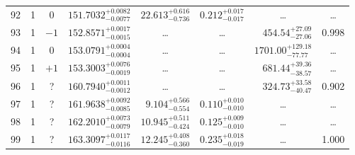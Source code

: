 \begin{table*}[!]
\begin{tabular}{llcrrlrc}
92 & 1 & 0 & $    151.7032_{-      0.0077}^{+      0.0082}$ & $      22.613_{-       0.736}^{+       0.616}$ & $       0.212_{-       0.017}^{+       0.017}$ & \multicolumn{1}{c}{\dots} & \dots\\[1pt]
93 & 1 & $-1$ & $    152.8571_{-      0.0015}^{+      0.0017}$ & \multicolumn{1}{c}{\dots} & \multicolumn{1}{c}{\dots} & $      454.54_{-       27.06}^{+       27.09}$ & 0.998\\[1pt]
94 & 1 & 0 & $    153.0791_{-      0.0004}^{+      0.0004}$ & \multicolumn{1}{c}{\dots} & \multicolumn{1}{c}{\dots} & $     1701.00_{-       77.77}^{+      129.18}$ & \dots\\[1pt]
95 & 1 & $+1$ & $    153.3003_{-      0.0019}^{+      0.0076}$ & \multicolumn{1}{c}{\dots} & \multicolumn{1}{c}{\dots} & $      681.44_{-       38.57}^{+       39.36}$ & \dots\\[1pt]

96 & 1 & ? & $    160.7940_{-      0.0012}^{+      0.0011}$ & \multicolumn{1}{c}{\dots} & \multicolumn{1}{c}{\dots} & $      324.73_{-       40.47}^{+       33.58}$ & 0.902\\[1pt]
97 & 1 & ? & $    161.9638_{-      0.0085}^{+      0.0092}$ & $       9.104_{-       0.554}^{+       0.566}$ & $       0.110_{-       0.010}^{+       0.010}$ & \multicolumn{1}{c}{\dots} & \dots \\[1pt]
98 & 1 & ? & $    162.2010_{-      0.0079}^{+      0.0073}$ & $      10.945_{-       0.424}^{+       0.511}$ & $       0.125_{-       0.010}^{+       0.009}$ & \multicolumn{1}{c}{\dots} & \dots \\[1pt]
99 & 1 & ? & $    163.3097_{-      0.0116}^{+      0.0117}$ & $      12.245_{-       0.360}^{+       0.408}$ & $       0.235_{-       0.019}^{+       0.018}$ & \multicolumn{1}{c}{\dots} & 1.000\\[1pt]

\hline
\end{tabular}
\end{table*}


